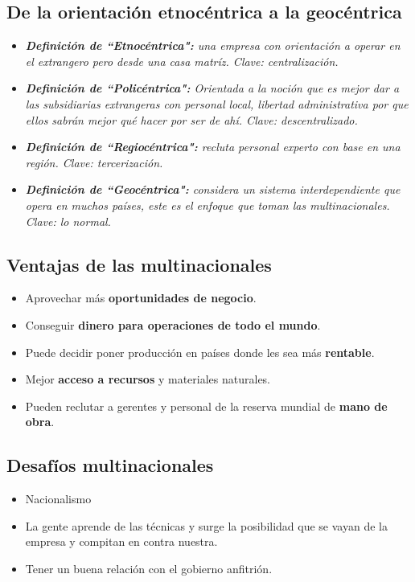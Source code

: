 \documentclass{article}
\begin{document}
\subsection{De la orientación etnocéntrica a la geocéntrica}
\begin{itemize}
    \item \emph{\textbf{Definición de ``Etnocéntrica":} una empresa con orientación a operar en el extrangero pero desde una casa matríz. Clave: centralización.}
    \item \emph{\textbf{Definición de ``Policéntrica":} Orientada a la noción que es mejor dar a las subsidiarias extrangeras con personal local, libertad administrativa por que ellos sabrán mejor qué hacer por ser de ahí. Clave: descentralizado.}
    \item \emph{\textbf{Definición de ``Regiocéntrica":} recluta personal experto con base en una región. Clave: tercerización.}
    \item \emph{\textbf{Definición de ``Geocéntrica":} considera un sistema interdependiente que opera en muchos países, este es el enfoque que toman las multinacionales. Clave: lo normal.}
\end{itemize}
\subsection{Ventajas de las multinacionales}
\begin{itemize}
    \item Aprovechar más \textbf{oportunidades de negocio}.
    \item Conseguir \textbf{dinero para operaciones de todo el mundo}.
    \item Puede decidir poner producción en países donde les sea más \textbf{rentable}.
    \item Mejor \textbf{acceso a recursos} y materiales naturales.
    \item Pueden reclutar a gerentes y personal de la reserva mundial de \textbf{mano de obra}.
\end{itemize}


\subsection{Desafíos multinacionales}
\begin{itemize}
    \item Nacionalismo 
    \item La gente aprende de las técnicas y surge la posibilidad que se vayan de la empresa y compitan en contra nuestra.
    \item Tener un buena relación con el gobierno anfitrión.
\end{itemize}
\end{document}
